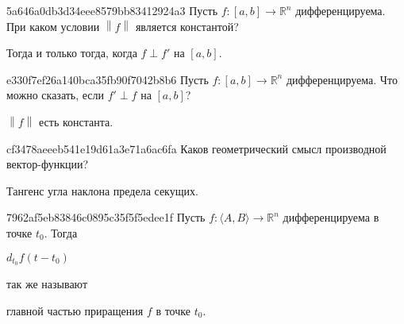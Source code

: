 \begin{note}{5a646a0db3d34eee8579bb83412924a3}
    Пусть \({ f : [a, b] \to \mathbb R^{n} }\) дифференцируема.
    При каком условии \({ \left\lVert f \right\rVert }\) является константой?

    \begin{cloze}{1}
        Тогда и только тогда, когда \({ f \perp f' }\) на \({ [a, b] }\).
    \end{cloze}
\end{note}

\begin{note}{e330f7ef26a140bca35fb90f7042b8b6}
    Пусть \({ f : [a, b] \to \mathbb R^{n} }\) дифференцируема.
    Что можно сказать, если \({ f' \perp f }\) на \({ [a, b] }\)?

    \begin{cloze}{1}
        \({ \left\lVert f \right\rVert }\) есть константа.
    \end{cloze}
\end{note}

\begin{note}{cf3478aeeeb541e19d61a3e71a6ac6fa}
    Каков геометрический смысл производной вектор-функции?

    \begin{cloze}{1}
        Тангенс угла наклона предела секущих.
    \end{cloze}
\end{note}

\begin{note}{7962af5eb83846c0895c35f5f5edee1f}
    Пусть \({ f : \langle A, B \rangle \to \mathbb R^{n} }\) дифференцируема в точке \({ t_0 }\).
    Тогда \begin{icloze}{2}\({ d_{t_0}f(t - t_0) }\)\end{icloze} так же называют \begin{icloze}{1}главной частью приращения \({ f }\) в точке \({ t_0 }\).\end{icloze}
\end{note}


